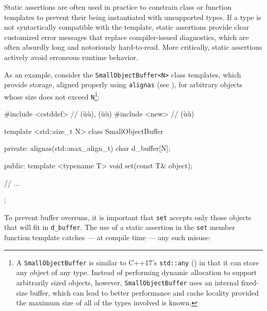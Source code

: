 Static assertions are often used in practice to constrain class or function templates to prevent their being instantiated with unsupported types. If a type is not syntactically compatible with the template, static assertions provide clear customized error messages that replace compiler-issued diagnostics, which are often absurdly long and notoriously hard-to-read. More critically, static assertions actively avoid erroneous runtime behavior.

As an example, consider the \lstinline!SmallObjectBuffer<N>! class
templates, which provide storage, aligned properly using \lstinline!alignas! (see
),
for arbitrary objects whose size does
not exceed \lstinline!N!{\cprotect\footnote{A \lstinline!SmallObjectBuffer! is
  similar to C++17's \lstinline!std::any! (\cite{cpprefstdany}) in
  that it can store any object of any type. Instead of performing
  dynamic allocation to support arbitrarily sized objects, however,
  \lstinline!SmallObjectBuffer! uses an internal fixed-size buffer, which
  can lead to better performance and cache locality provided the
  maximum size of all of the types involved is known.}}:

%
%
\begin{emcppslisting}[emcppsbatch=e3]
#include <cstddef> // (ù{}ù), (ù{}ù)
#include <new>     // (ù{}ù)

template <std::size_t N>
class SmallObjectBuffer
{
private:
    alignas(std::max_align_t) char d_buffer[N];

public:
    template <typename T>
    void set(const T& object);

    // ...
};
\end{emcppslisting}


\noindent To prevent buffer overruns, it is important that \lstinline!set! accepts
only those objects that will fit in \lstinline!d_buffer!. The use of a
static assertion in the \lstinline!set! member function template catches
--- at compile time --- any such misuse:

